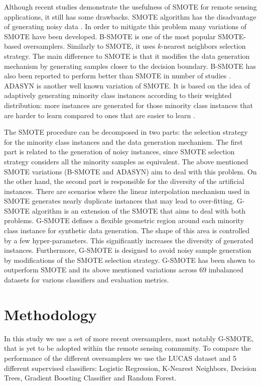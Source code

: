\documentclass[remotesensing,article,submit,moreauthors,pdftex]{Definitions/mdpi}
\begin{document}
Although recent studies demonstrate the usefulness of SMOTE for remote sensing
applications, it still has some drawbacks. SMOTE algorithm has the disadvantage
of generating noisy data \cite{Douzas2017}. In order to mitigate this problem
many variations of SMOTE have been developed. B-SMOTE \cite{Han2005} is one of
the most popular SMOTE-based oversamplers. Similarly to SMOTE, it uses
$k$-nearest neighbors selection strategy. The main difference to SMOTE is that
it modifies the data generation mechanism by generating samples closer to the
decision boundary. B-SMOTE has also been reported to perform better than SMOTE
in number of studies \cite{Nguyen2009, Ramentol2012}. ADASYN is another well
known variation of SMOTE. It is based on the idea of adaptively generating
minority class instances according to their weighted distribution: more
instances are generated for those minority class instances that are harder to
learn compared to ones that are easier to learn \cite{HaiboHe2008}.

The SMOTE procedure can be decomposed in two parts: the selection strategy for
the minority class instances and the data generation mechanism. The first part
is related to the generation of noisy instances, since SMOTE selection strategy
considers all the minority samples as equivalent. The above mentioned SMOTE
variations (B-SMOTE and ADASYN) aim to deal with this problem. On the other
hand, the second part is responsible for the diversity of the artificial
instances. There are scenarios where the linear interpolation mechanism used in
SMOTE generates nearly duplicate instances that may lead to over-fitting.
G-SMOTE algorithm is an extension of the SMOTE that aims to deal with both
problems. G-SMOTE defines a flexible geometric region around each minority class
instance for synthetic data generation. The shape of this area is controlled by
a few hyper-parameters. This significantly increases the diversity of generated
instances. Furthermore, G-SMOTE is designed to avoid noisy sample generation by
modifications of the SMOTE selection strategy. G-SMOTE has been shown to
outperform SMOTE and its above mentioned variations across 69 imbalanced
datasets for various classifiers and evaluation metrics.

\section{Methodology}

In this study we use a set of more recent oversamplers, most notably G-SMOTE,
that is yet to be adopted within the remote sensing community. To compare the
performance of the different oversamplers we use the LUCAS dataset and 5
different supervised classifiers: Logistic Regression, K-Nearest Neighbors,
Decision Trees, Gradient Boosting Classifier and Random Forest.
\end{document}
